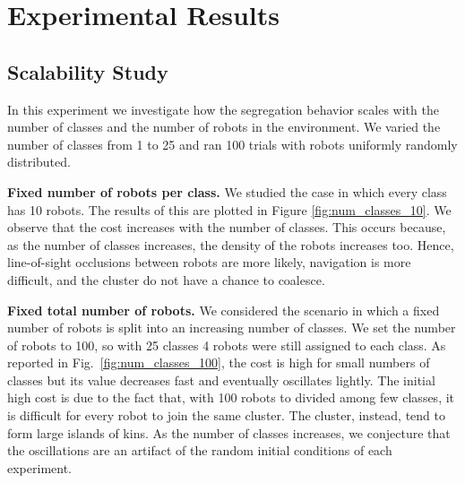 \documentclass[conference]{IEEEtran}
\newcommand{\myparagraph}[1]{\textbf{#1.}}
\begin{document}

\section{Experimental Results}



\subsection{Scalability Study} \label{section:scalability}

In this experiment we investigate how the segregation behavior scales with the
number of classes and the number of robots in the environment. We varied the
number of classes from 1 to 25 and ran 100 trials with robots uniformly randomly
distributed.

\myparagraph{Fixed number of robots per class}
We studied the case in which every class has 10 robots. The results of this are
plotted in Figure \ref{fig:num_classes_10}. We observe that the cost increases
with the number of classes. This occurs because, as the number of classes
increases, the density of the robots increases too. Hence, line-of-sight
occlusions between robots are more likely, navigation is more difficult, and the
cluster do not have a chance to coalesce.

\myparagraph{Fixed total number of robots}
We considered the scenario in which a fixed number of robots is split into an
increasing number of classes. We set the number of robots to 100, so with 25
classes 4 robots were still assigned to each class. As reported in
Fig.~\ref{fig:num_classes_100}, the cost is high for small numbers of classes
but its value decreases fast and eventually oscillates lightly. The initial high
cost is due to the fact that, with 100 robots to divided among few classes, it
is difficult for every robot to join the same cluster. The cluster, instead,
tend to form large islands of kins. As the number of classes increases, we
conjecture that the oscillations are an artifact of the random initial
conditions of each experiment.
\end{document}
